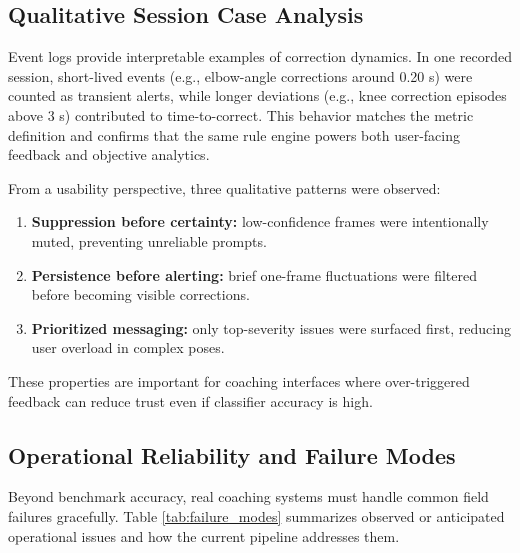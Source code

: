 \documentclass[conference]{IEEEtran}
\begin{document}
\subsection{Qualitative Session Case Analysis}
Event logs provide interpretable examples of correction dynamics. In one recorded session, short-lived events (e.g., elbow-angle corrections around 0.20 s) were counted as transient alerts, while longer deviations (e.g., knee correction episodes above 3 s) contributed to time-to-correct. This behavior matches the metric definition and confirms that the same rule engine powers both user-facing feedback and objective analytics.

From a usability perspective, three qualitative patterns were observed:
\begin{enumerate}
\item \textbf{Suppression before certainty:} low-confidence frames were intentionally muted, preventing unreliable prompts.
\item \textbf{Persistence before alerting:} brief one-frame fluctuations were filtered before becoming visible corrections.
\item \textbf{Prioritized messaging:} only top-severity issues were surfaced first, reducing user overload in complex poses.
\end{enumerate}

These properties are important for coaching interfaces where over-triggered feedback can reduce trust even if classifier accuracy is high.

\subsection{Operational Reliability and Failure Modes}
Beyond benchmark accuracy, real coaching systems must handle common field failures gracefully. Table \ref{tab:failure_modes} summarizes observed or anticipated operational issues and how the current pipeline addresses them.
\end{document}
